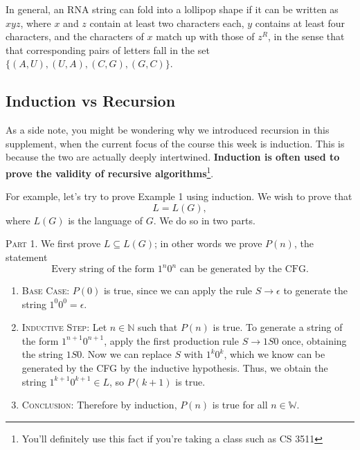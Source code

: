 \documentclass{article}
\begin{document}
        \qquad In general, an RNA string can fold into a lollipop shape if it can be written as $xyz$, where $x$ and $z$ contain at least two characters each, $y$ contains at least four characters, and the characters of $x$ match up with those of $z^{R}$, in the sense that that corresponding pairs of letters fall in the set $\{(A, U), (U, A), (C, G), (G, C)\}$.

\subsection*{Induction vs Recursion}
    As a side note, you might be wondering why we introduced recursion in this supplement, when the current focus of the course this week is induction. This is because the two are actually deeply intertwined. \textbf{Induction is often used to prove the validity of recursive algorithms}\footnote{You'll definitely use this fact if you're taking a class such as CS 3511}.

    \vspace{2mm}
    For example, let's try to prove Example 1 using induction. We wish to prove that $$L = L(G),$$ where $L(G)$ is the language of $G$. We do so in two parts.

    \textsc{Part 1.} We first prove $L \subseteq L(G)$; in other words we prove $P(n)$, the statement $$\text{Every string of the form $1^n0^n$ can be generated by the CFG.}$$
    \begin{enumerate} [label = {}, nosep, leftmargin = .25in]
        \item \textsc{Base Case:} $P(0)$ is true, since we can apply the rule $S \rightarrow \epsilon$ to generate the string $1^{0}0^{0} = \epsilon$.
    
        \vspace{2mm}
        \item \textsc{Inductive Step:} Let $n \in \mathbb{N}$ such that $P(n)$ is true. To generate a string of the form $1^{n+1}0^{n+1}$, apply the first production rule $S \rightarrow 1S0$ once, obtaining the string $1S0$. Now we can replace $S$ with $1^{k}0^{k}$, which we know can be generated by the CFG by the inductive hypothesis. Thus, we obtain the string $1^{k+1}0^{k+1} \in L$, so $P(k + 1)$ is true.
        
        \vspace{2mm}
        \item \textsc{Conclusion:} Therefore by induction, $P(n)$ is true for all $n \in \mathbb{W}$.
    \end{enumerate}
    
\end{document}
